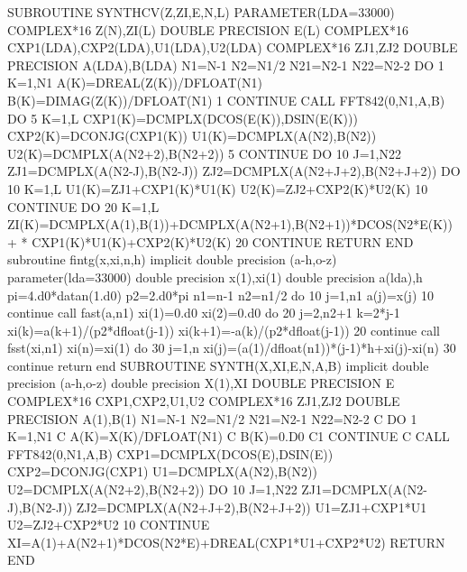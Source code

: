         SUBROUTINE SYNTHCV(Z,ZI,E,N,L)
        PARAMETER(LDA=33000)
        COMPLEX*16 Z(N),ZI(L)
        DOUBLE PRECISION E(L)
        COMPLEX*16 CXP1(LDA),CXP2(LDA),U1(LDA),U2(LDA)
        COMPLEX*16 ZJ1,ZJ2
        DOUBLE PRECISION A(LDA),B(LDA)
        N1=N-1
        N2=N1/2
        N21=N2-1
        N22=N2-2
        DO 1 K=1,N1
        A(K)=DREAL(Z(K))/DFLOAT(N1)
        B(K)=DIMAG(Z(K))/DFLOAT(N1)
1       CONTINUE
        CALL FFT842(0,N1,A,B)
        DO 5 K=1,L
        CXP1(K)=DCMPLX(DCOS(E(K)),DSIN(E(K)))
        CXP2(K)=DCONJG(CXP1(K))
        U1(K)=DCMPLX(A(N2),B(N2))
        U2(K)=DCMPLX(A(N2+2),B(N2+2))
 5      CONTINUE
        DO 10 J=1,N22
        ZJ1=DCMPLX(A(N2-J),B(N2-J))
        ZJ2=DCMPLX(A(N2+J+2),B(N2+J+2))
        DO 10 K=1,L
        U1(K)=ZJ1+CXP1(K)*U1(K)
        U2(K)=ZJ2+CXP2(K)*U2(K)
 10     CONTINUE
        DO 20 K=1,L
        ZI(K)=DCMPLX(A(1),B(1))+DCMPLX(A(N2+1),B(N2+1))*DCOS(N2*E(K))+
     *        CXP1(K)*U1(K)+CXP2(K)*U2(K)
 20     CONTINUE
        RETURN
        END
        subroutine fintg(x,xi,n,h)
        implicit double precision (a-h,o-z)
        parameter(lda=33000)
        double precision x(1),xi(1)
        double precision a(lda),h
        pi=4.d0*datan(1.d0)
        p2=2.d0*pi
        n1=n-1
        n2=n1/2
        do 10 j=1,n1
        a(j)=x(j)
 10     continue
        call fast(a,n1)
        xi(1)=0.d0
        xi(2)=0.d0
        do 20 j=2,n2+1
        k=2*j-1
        xi(k)=a(k+1)/(p2*dfloat(j-1))
        xi(k+1)=-a(k)/(p2*dfloat(j-1))
 20     continue
        call fsst(xi,n1)
        xi(n)=xi(1)
        do 30 j=1,n 
        xi(j)=(a(1)/dfloat(n1))*(j-1)*h+xi(j)-xi(n)
 30     continue
        return
        end
        SUBROUTINE SYNTH(X,XI,E,N,A,B)
        implicit double precision (a-h,o-z)
        double precision X(1),XI
        DOUBLE PRECISION E
        COMPLEX*16 CXP1,CXP2,U1,U2
        COMPLEX*16 ZJ1,ZJ2
        DOUBLE PRECISION A(1),B(1)
        N1=N-1
        N2=N1/2
        N21=N2-1
        N22=N2-2
C        DO 1 K=1,N1
C        A(K)=X(K)/DFLOAT(N1)
C        B(K)=0.D0
C1       CONTINUE
C        CALL FFT842(0,N1,A,B)
        CXP1=DCMPLX(DCOS(E),DSIN(E))
        CXP2=DCONJG(CXP1)
        U1=DCMPLX(A(N2),B(N2))
        U2=DCMPLX(A(N2+2),B(N2+2))
        DO 10 J=1,N22
        ZJ1=DCMPLX(A(N2-J),B(N2-J))
        ZJ2=DCMPLX(A(N2+J+2),B(N2+J+2))
        U1=ZJ1+CXP1*U1
        U2=ZJ2+CXP2*U2
 10     CONTINUE
        XI=A(1)+A(N2+1)*DCOS(N2*E)+DREAL(CXP1*U1+CXP2*U2)
        RETURN
        END


